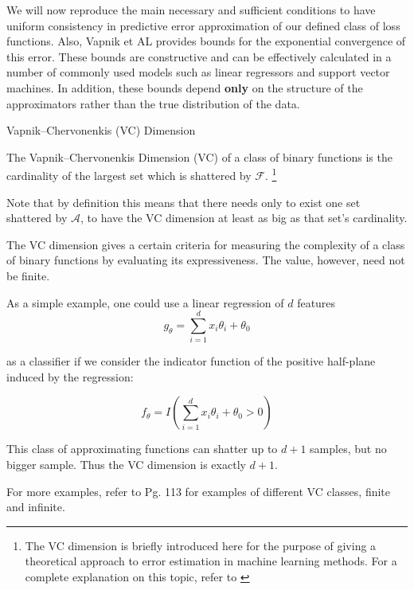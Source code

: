 We will now reproduce the main necessary and sufficient conditions to have uniform consistency in predictive error approximation of our defined class of loss functions. Also,
Vapnik et AL provides bounds for the exponential convergence of this error. These bounds are constructive and can be effectively calculated in a number of commonly used models such as linear regressors and support vector machines. In addition, these bounds depend \textbf{only} on the structure of the approximators rather than the true distribution of the data.


\begin{definition}{Vapnik--Chervonenkis (VC) Dimension}

The Vapnik--Chervonenkis Dimension (VC) of a class of binary functions is the cardinality of the largest set which is shattered by $\mathcal {F}$. \footnote{The VC dimension is briefly introduced here for the purpose of giving a theoretical approach to error estimation in machine learning methods. For a complete explanation on this topic, refer to \textcite{vapnik-nature2013}}
\end{definition}


Note that by definition this means that there needs only to exist one set shattered by $\mathcal {A}$, to have the VC dimension at least as big as that set's cardinality.


The VC dimension gives a certain criteria for measuring the complexity of a class of binary functions by evaluating its expressiveness. The value, however, need not be finite.

As a simple example, one could use a linear regression of $d$ features 
\begin{equation}
g_{\theta} = \sum_{i=1}^d x_i \theta_i + \theta_0
\end{equation}

 as a classifier if we consider the indicator function of the positive half-plane induced by the regression: 
 
\begin{equation}
f_{\theta} = I(\sum_{i=1}^d x_i \theta_i + \theta_0 > 0)
\end{equation}

This class of approximating functions can shatter up to $d+1$ samples, but no bigger sample. Thus the VC dimension is exactly $d+1$.

For more examples, refer to \textcite{cherkassky-learning2007} Pg. 113 for examples of different VC classes, finite and infinite.

